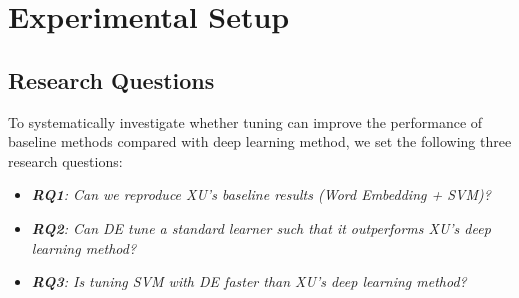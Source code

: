 \documentclass[sigconf,review, anonymous]{acmart}
\theoremstyle{break}
\newcommand{\bi}{\begin{itemize}[leftmargin=0.4cm]}
\newcommand{\ei}{\end{itemize}}
\begin{document}
 





\section{Experimental Setup}\label{experiment}
\subsection{Research Questions}\label{RQ}
 To systematically investigate whether tuning can improve the 
 performance of baseline methods compared with deep learning method, we set
 the following three research questions:
 

 
 \bi
 \item {\it \textbf{RQ1}: Can we reproduce XU's baseline results (Word Embedding + SVM)?}
 \item {\it \textbf{RQ2}: Can   DE   tune a standard learner such that
 it outperforms XU's deep learning method?}
 \item {\it \textbf{RQ3}: Is tuning SVM with DE faster than XU's deep learning method?}
 \ei
 
\end{document}
